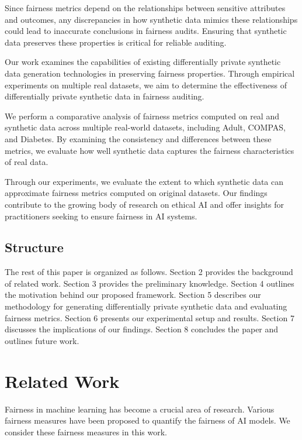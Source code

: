\documentclass[manuscript,screen,review,anonymous]{acmart}
\begin{document}
Since fairness metrics depend on the relationships between sensitive attributes and outcomes, any discrepancies in how synthetic data mimics these relationships could lead to inaccurate conclusions in fairness audits. Ensuring that synthetic data preserves these properties is critical for reliable auditing.

Our work examines the capabilities of existing differentially private synthetic data generation technologies in preserving fairness properties. Through empirical experiments on multiple real datasets, we aim to determine the effectiveness of differentially private synthetic data in fairness auditing.

We perform a comparative analysis of fairness metrics computed on real and synthetic data across multiple real-world datasets, including Adult, COMPAS, and Diabetes. By examining the consistency and differences between these metrics, we evaluate how well synthetic data captures the fairness characteristics of real data.

Through our experiments, we evaluate the extent to which synthetic data can approximate fairness metrics computed on original datasets. Our findings contribute to the growing body of research on ethical AI and offer insights for practitioners seeking to ensure fairness in AI systems.

\subsection{Structure}

The rest of this paper is organized as follows. Section 2 provides the background of related work. Section 3 provides the preliminary knowledge. Section 4 outlines the motivation behind our proposed framework. Section 5 describes our methodology for generating differentially private synthetic data and evaluating fairness metrics. Section 6 presents our experimental setup and results. Section 7 discusses the implications of our findings. Section 8 concludes the paper and outlines future work.

\section{Related Work}


Fairness in machine learning has become a crucial area of research\cite{barocas2023fairness}. Various fairness measures have been proposed to quantify\cite{yeh2024analyzing} the fairness of AI models\cite{pessach2022review,corbett2017algorithmic,vzliobaite2017measuring,hardt2016equality,corbett2017algorithmic,berk2021fairness,chouldechova2017fair,kleinberg2016inherent}. We consider these fairness measures in this work.
\end{document}
